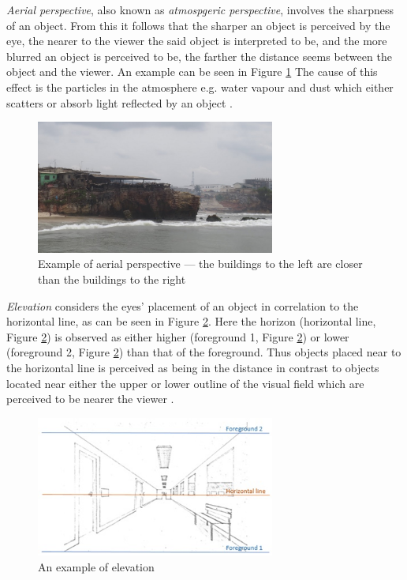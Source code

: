 \textit{Aerial perspective}, also known as \textit{atmospgeric perspective},  involves the sharpness of an object. From this it follows that the sharper an object is perceived by the eye, the nearer to the viewer the said object is interpreted to be, and the more blurred an object is perceived to be, the farther the distance seems between the object and the viewer. An example can be seen in Figure \ref{fig:cue2} The cause of this effect is the particles in the atmosphere e.g. water vapour and dust which either scatters or absorb light reflected by an object \cite{Gale}.  

\begin{figure}[h!]
   \centering
   \includegraphics[width=0.7\textwidth]{figures/cue2.jpg}
   \caption{Example of aerial perspective --- the buildings to the left are closer than the buildings to the right}\label{fig:cue2}
\end{figure}

\textit{Elevation} considers the eyes’ placement of an object in correlation to the horizontal line, as can be seen in Figure \ref{fig:cue3}. Here the horizon (horizontal line, Figure \ref{fig:cue3}) is observed as either higher (foreground 1, Figure \ref{fig:cue3}) or lower  (foreground 2, Figure \ref{fig:cue3}) than that of the foreground. Thus objects placed near to the horizontal line is perceived as being in the distance in contrast to objects located near either the upper or lower outline of the visual field which are perceived to be nearer the viewer \cite{Gale}.   

\begin{figure}[h!]
   \centering
   \includegraphics[width=0.7\textwidth]{figures/cue3.jpg}
   \caption{An example of elevation}\label{fig:cue3}
\end{figure}

